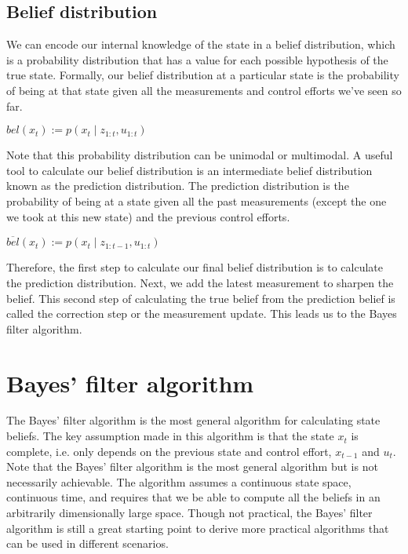 \documentclass[twoside]{article}
\begin{document}
\subsection{Belief distribution}
We can encode our internal knowledge of the state in a belief distribution, which is a probability distribution that has a value for each possible hypothesis of the true state. Formally, our belief distribution at a particular state is the probability of being at that state given all the measurements and control efforts we've seen so far. 

\begin{center}
$bel(x_t):=p(x_t\mid z_{1:t},u_{1:t})$
\end{center} 

Note that this probability distribution can be unimodal or multimodal. A useful tool to calculate our belief distribution is an intermediate belief distribution known as the prediction distribution. The prediction distribution is the probability of being at a state given all the past measurements (except the one we took at this new state) and the previous control efforts. 

\begin{center}
$\overline{bel}(x_t):=p(x_t\mid z_{1:t-1},u_{1:t})$
\end{center} 

Therefore, the first step to calculate our final belief distribution is to calculate the prediction distribution. Next, we add the latest measurement to sharpen the belief. This second step of calculating the true belief from the prediction belief is called the correction step or the measurement update.  This leads us to the Bayes filter algorithm. 

\section{Bayes' filter algorithm}
The Bayes' filter algorithm is the most general algorithm for calculating state beliefs. The key assumption made in this algorithm is that the state $x_t$ is complete, i.e. only depends on the previous state and control effort, $x_{t-1}$ and $u_t$. Note that the Bayes' filter algorithm is the most general algorithm but is not necessarily achievable. The algorithm assumes a continuous state space, continuous time, and requires that we be able to compute all the beliefs in an arbitrarily dimensionally large space. Though not practical, the Bayes' filter algorithm is still a great starting point to derive more practical algorithms that can be used in different scenarios. 
\end{document}

